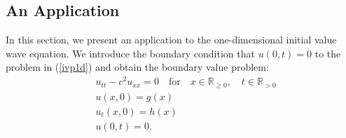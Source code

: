 \documentclass[a4paper, 12pt]{article}
\numberwithin{equation}{section}
\begin{document}
\subsection{An Application} \label{anapplication}
In this section, we present an application to the one-dimensional
initial value wave equation. We introduce the boundary condition that $u(0,t)=0$
to the problem in (\ref{ivp1d}) and obtain the boundary value problem:
\begin{equation} \label{bvp1d}
    \begin{aligned}
    &u_{tt}-c^2u_{xx}=0 \quad \textrm {for} \quad x \in \mathbb{R}_{\ge 0}, \quad t \in \mathbb{R}_{>0}\\
    &u(x,0)=g(x)\\
    &u_t(x,0)=h(x)\\
    &u(0,t)=0.
    \end{aligned}
\end{equation}
\end{document}
